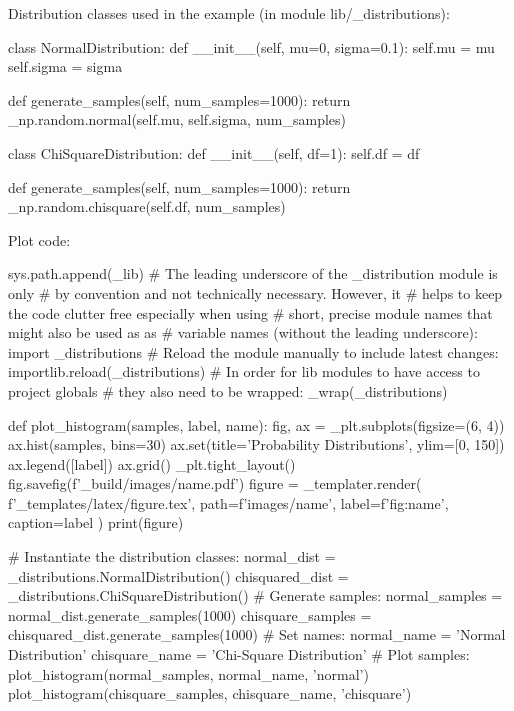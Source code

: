 \documentclass[a4paper]{book}
\begin{document}
Distribution classes used in the example (in module lib/\_distributions):
\begin{python}
class NormalDistribution:
    def __init__(self, mu=0, sigma=0.1):
        self.mu = mu
        self.sigma = sigma
   
    def generate_samples(self, num_samples=1000):
        return _np.random.normal(self.mu, self.sigma, num_samples)

class ChiSquareDistribution:
    def __init__(self, df=1):
        self.df = df

    def generate_samples(self, num_samples=1000):
        return _np.random.chisquare(self.df, num_samples)

\end{python}
Plot code:
\begin{python}
sys.path.append(_lib)
# The leading underscore of the _distribution module is only 
# by convention and not technically necessary. However, it 
# helps to keep the code clutter free especially when using 
# short, precise module names that might also be used as as 
# variable names (without the leading underscore):
import _distributions
# Reload the module manually to include latest changes: 
importlib.reload(_distributions)
# In order for lib modules to have access to project globals 
# they also need to be wrapped:
_wrap(_distributions)

def plot_histogram(samples, label, name):
    fig, ax = _plt.subplots(figsize=(6, 4))
    ax.hist(samples, bins=30)
    ax.set(title='Probability Distributions', ylim=[0, 150])
    ax.legend([label])
    ax.grid()
    _plt.tight_layout()
    fig.savefig(f'{_build}/images/{name}.pdf')
    figure = _templater.render(
        f'{_templates}/latex/figure.tex',
        path=f'images/{name}',
        label=f'fig:{name}',
        caption=label
    )
    print(figure)

# Instantiate the distribution classes:
normal_dist         = _distributions.NormalDistribution()
chisquared_dist     = _distributions.ChiSquareDistribution()
# Generate samples:
normal_samples      = normal_dist.generate_samples(1000)
chisquare_samples   = chisquared_dist.generate_samples(1000)
# Set names:
normal_name         = 'Normal Distribution'
chisquare_name      = 'Chi-Square Distribution'
# Plot samples:
plot_histogram(normal_samples, normal_name, 'normal')
plot_histogram(chisquare_samples, chisquare_name, 'chisquare')

\end{python}
\printbibliography
\end{document}
